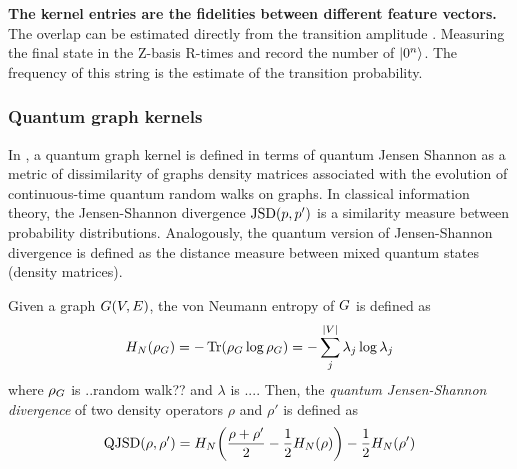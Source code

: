 \textbf{The kernel entries are the fidelities between different feature vectors.}
The overlap can be estimated directly from the transition amplitude 
.
Measuring the final state in the Z-basis R-times and record the number of $\ket{0^n}$.
The frequency of this string is the estimate of the transition probability.


\subsubsection{Quantum graph kernels}
In \cite{baiQuantumJensenShannon2015},
a quantum graph kernel is defined in terms of quantum Jensen Shannon as a metric of dissimilarity of graphs
density matrices associated with the evolution of continuous-time quantum random walks on graphs.
In classical information theory, the Jensen-Shannon divergence $\textup{JSD}(p,p')$ is a similarity measure between probability distributions.
Analogously, the quantum version of Jensen-Shannon divergence is defined as the distance measure between mixed quantum states (density matrices).
\begin{definition}[]
	Given a graph $G(V,E)$, the von Neumann entropy of $G$ is defined as
	\begin{equation}
		H_N (\rho_{G}) = -\Tr(\rho_{G}\log \rho_{G})
		= - \sum_{j}^{\abs{V}} \lambda_j \log \lambda_j
	\end{equation}
	where $\rho_{G}$ is ..random walk?? and $\lambda$ is ....
	Then,
	the \emph{quantum Jensen-Shannon divergence} of two density operators $\rho$ and $\rho'$ is defined as
	\begin{equation}
		\textup{QJSD} (\rho,\rho') = 
		H_N\qty(\frac{\rho+\rho'}{2}- \frac{1}{2}H_N(\rho)) - \frac{1}{2} H_N (\rho')
	\end{equation}
\end{definition}
